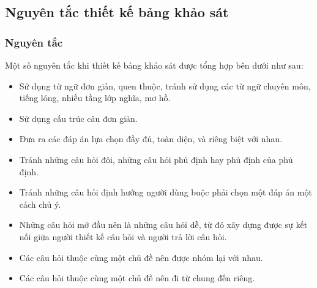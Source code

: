 \subsection{Nguyên tắc thiết kế bảng khảo sát}

\subsubsection{Nguyên tắc}

Một số nguyên tắc khi thiết kế bảng khảo sát được tổng hợp bên dưới như sau:
\begin{itemize}
    \item Sử dụng từ ngữ đơn giản, quen thuộc, tránh sử dụng các từ ngữ chuyên môn, tiếng lóng, nhiều tầng lớp nghĩa, mơ hồ.
    \item Sử dụng cấu trúc câu đơn giản.
    \item Đưa ra các đáp án lựa chọn đầy đủ, toàn diện, và riêng biệt với nhau.
    \item Tránh những câu hỏi đôi, những câu hỏi phủ định hay phủ định của phủ định.
    \item Tránh những câu hỏi định hướng người dùng buộc phải chọn 
 một đáp án một cách chủ ý.
    \item Những câu hỏi mở đầu nên là những câu hỏi dễ, từ đó xây dựng được sự kết nối giữa người thiết kế câu hỏi và người trả lời câu hỏi.
    \item Các câu hỏi thuộc cùng một chủ đề nên được nhóm lại với nhau.
    \item Các câu hỏi thuộc cùng một chủ đề nên đi từ chung đến riêng.
\end{itemize}


